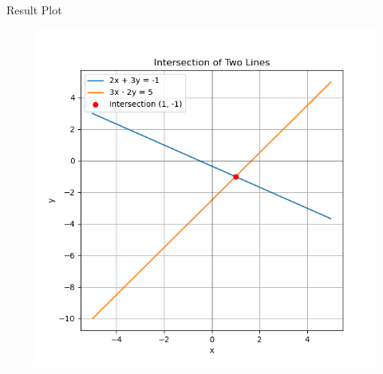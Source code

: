 \documentclass{beamer}
\numberwithin{equation}{section}
\theoremstyle{remark}
\begin{document}
\begin{frame}{Result Plot}
 \begin{figure}[H]
     \centering
     \includegraphics[width=0.7\columnwidth]{figs/fig1.png}
     \caption*{}
     \label{fig:fig1}
 \end{figure}
 
\end{frame}
\end{document}

